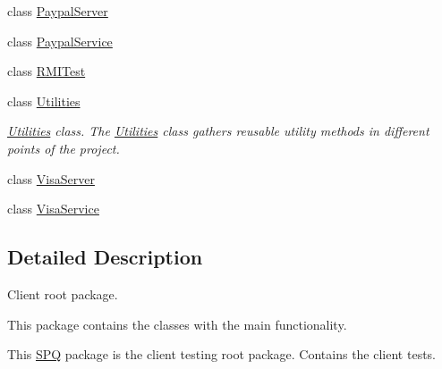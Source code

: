 \begin{DoxyCompactItemize}
class \mbox{\hyperlink{class_s_p_q_1_1_paypal_server}{Paypal\+Server}}
\item 
class \mbox{\hyperlink{class_s_p_q_1_1_paypal_service}{Paypal\+Service}}
\item 
class \mbox{\hyperlink{class_s_p_q_1_1_r_m_i_test}{R\+M\+I\+Test}}
\item 
class \mbox{\hyperlink{class_s_p_q_1_1_utilities}{Utilities}}
\begin{DoxyCompactList}\small\item\em \mbox{\hyperlink{class_s_p_q_1_1_utilities}{Utilities}} class. The \mbox{\hyperlink{class_s_p_q_1_1_utilities}{Utilities}} class gathers reusable utility methods in different points of the project. \end{DoxyCompactList}\item 
class \mbox{\hyperlink{class_s_p_q_1_1_visa_server}{Visa\+Server}}
\item 
class \mbox{\hyperlink{class_s_p_q_1_1_visa_service}{Visa\+Service}}
\end{DoxyCompactItemize}


\subsection{Detailed Description}
Client root package. 

This package contains the classes with the main functionality.

This \mbox{\hyperlink{namespace_s_p_q}{S\+PQ}} package is the client testing root package. Contains the client tests. 